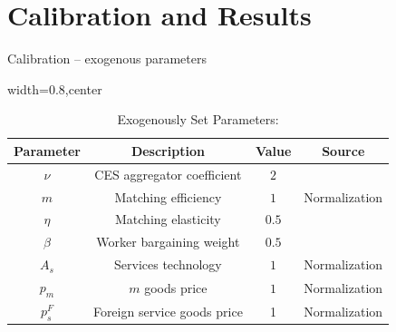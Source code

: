 \documentclass[9pt,xcolor={svgnames}]{beamer}
\begin{document}
\section{Calibration and Results}

\begin{frame}{Calibration -- exogenous parameters}
    \begin{table}[h!]
\centering
\caption{Exogenously Set Parameters:}\label{table_set_parameters}
\begin{adjustbox}{width=0.8\columnwidth,center}
\begin{tabular}{||c c c c||}\hline
\textbf{Parameter} & \textbf{Description} & \textbf{Value} & \textbf{Source} \\\hline\hline
$\nu$ & CES aggregator coefficient & $2$ & \cite{GTAP} \\
$m$ & Matching efficiency & $1$ & Normalization \\
$\eta$ & Matching elasticity & $0.5$ & \cite{petrongolo2001looking} \\
$\beta$ & Worker bargaining weight & $0.5$ & \cite{shimer2005cyclical} \\
$A_s$ & Services technology & $1$ & Normalization \\
$p_m$ & $m$ goods price & $1$  & Normalization  \\
$p_s^F$ & Foreign service goods price & 1 & Normalization 
\\\hline
\end{tabular}
\end{adjustbox}
\end{table}




\end{frame}
\end{document}
